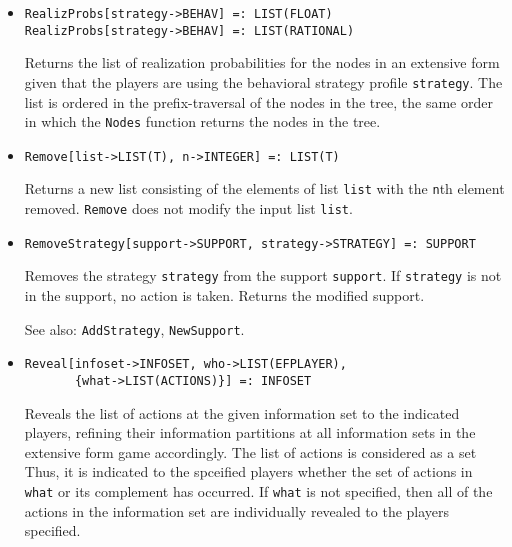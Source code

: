 \begin{itemize}
\item
\protect \large \begin{verbatim}
RealizProbs[strategy->BEHAV] =: LIST(FLOAT)
RealizProbs[strategy->BEHAV] =: LIST(RATIONAL)
\end{verbatim}\normalsize

\bd
Returns the list of realization probabilities for the
nodes in an extensive form given that the players are using the behavioral
strategy profile \verb+strategy+.  The list is ordered in the prefix-traversal
of the nodes in the tree, the same order in which the {\tt Nodes} function
returns the nodes in the tree.
\ed

\item
\protect \large \begin{verbatim}
Remove[list->LIST(T), n->INTEGER] =: LIST(T)
\end{verbatim}\normalsize

\bd
Returns a new list consisting of the elements of list
\verb+list+ with the \verb+n+th element removed.  {\tt Remove} does not
modify the input list \verb+list+.
\ed

\item
\protect \large \begin{verbatim}
RemoveStrategy[support->SUPPORT, strategy->STRATEGY] =: SUPPORT
\end{verbatim}\normalsize

\bd
Removes the strategy \verb+strategy+ from the
support \verb+support+.  If \verb+strategy+ is not in the support,
no action is taken.  Returns the modified support.
\item
[See also:] {\tt AddStrategy}, {\tt NewSupport}.
\ed

\item
\protect \large \begin{verbatim}
Reveal[infoset->INFOSET, who->LIST(EFPLAYER), 
       {what->LIST(ACTIONS)}] =: INFOSET
\end{verbatim}\normalsize

\bd
Reveals the list of actions at the given information
set to the indicated players, refining their information partitions at
all information sets in the extensive form game accordingly.  The list
of actions is considered as a set Thus, it is indicated to the
spceified players whether the set of actions in \verb+what+ or its
complement has occurred.  If \verb+what+ is not specified, then all of
the actions in the information set are individually revealed to
the players specified.  
\ed



\end{itemize}
